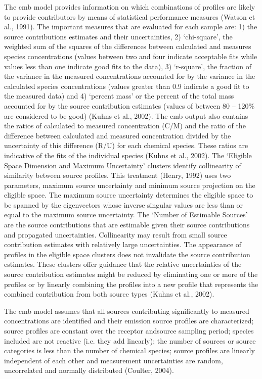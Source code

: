 \documentclass{nwureport}
\begin{document}
The \gls{cmb} model provides information on which combinations of profiles are likely to provide contributors by
means of statistical performance measures (Watson et al., 1991). The important measures that are
evaluated for each sample are: 1) the source contributions estimates and their uncertainties, 2) ‘chi-square’,
the weighted sum of the squares of the differences between calculated and measures species
concentrations (values between two and four indicate acceptable fits while values less than one indicate
good fits to the data), 3) ‘r-square’, the fraction of the variance in the measured concentrations accounted for
by the variance in the calculated species concentrations (values greater than 0.9 indicate a good fit to the
measured data) and 4) ‘percent mass’ or the percent of the total mass accounted for by the source
contribution estimates (values of between 80 – 120\% are considered to be good) (Kuhns et al., 2002).
The \gls{cmb} output also contains the ratios of calculated to measured concentration (C/M) and the ratio of the
difference between calculated and measured concentration divided by the uncertainty of this difference (R/U)
for each chemical species. These ratios are indicative of the fits of the individual species (Kuhns et al.,
2002). The ‘Eligible Space Dimension and Maximum Uncertainty’ clusters identify collinearity of similarity
between source profiles. This treatment (Henry, 1992) uses two parameters, maximum source uncertainty
and minimum source projection on the eligible space. The maximum source uncertainty determines the
eligible space to be spanned by the eigenvectors whose inverse singular values are less than or equal to the
maximum source uncertainty. The ‘Number of Estimable Sources’ are the source contributions that are
estimable given their source contributions and propagated uncertainties. Collinearity may result from small
source contribution estimates with relatively large uncertainties. The appearance of profiles in the eligible
space clusters does not invalidate the source contribution estimates. These clusters offer guidance that the
relative uncertainties of the source contribution estimates might be reduced by eliminating one or more of the
profiles or by linearly combining the profiles into a new profile that represents the combined contribution from
both source types (Kuhns et al., 2002).

The \gls{cmb} model assumes that all sources contributing significantly to measured concentrations are identified
and their emission source profiles are characterized; source profiles are constant over the receptor andsource sampling period; species included are not reactive (i.e. they add linearly); the number of sources or
source categories is less than the number of chemical species; source profiles are linearly independent of
each other and measurement uncertainties are random, uncorrelated and normally distributed (Coulter,
2004).
\end{document}
